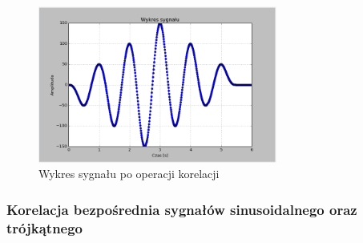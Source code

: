 \documentclass{article}
\begin{document}
{{    \begin{figure}[h!]
        \centering
        \includegraphics[width=0.7\textwidth]{img/kor_bez_2.png}
        \caption{Wykres sygnału po operacji korelacji}
    \end{figure}
}

\subsubsection{Korelacja bezpośrednia sygnałów sinusoidalnego oraz trójkątnego} \label{eksperyment:korelacja3}{

}}
\end{document}

